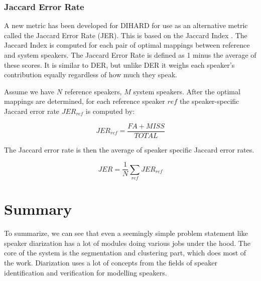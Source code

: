	\subsubsection{Jaccard Error Rate}
	A new metric has been developed for DIHARD for use as an alternative metric called the Jaccard Error Rate (JER). This is based on the Jaccard Index \cite{hamers1989similarity}. The Jaccard Index is computed for each pair of optimal mappings between reference and system speakers. The Jaccard Error Rate is defined as 1 minus the average of these scores. It is similar to DER, but unlike DER it weighs each speaker's contribution equally regardless of how much they speak.
	
	Assume we have $N$ reference speakers, $M$ system speakers. After the optimal mappings are determined, for each reference speaker $ref$ the speaker-specific Jaccard error rate $JER_{ref}$ is computed by:
	
	$$ JER_{ref} = \frac{FA + MISS}{TOTAL} $$
	
	The Jaccard error rate is then the average of speaker specific Jaccard error rates.
	
	$$ JER = \frac{1}{N} \sum_{ref} JER_{ref} $$

\section{Summary}
	To summarize, we can see that even a seemingly simple problem statement like speaker diarization has a lot of modules doing various jobs under the hood. The core of the system is the segmentation and clustering part, which does most of the work. Diarization uses a lot of concepts from the fields of speaker identification and verification for modelling speakers.
